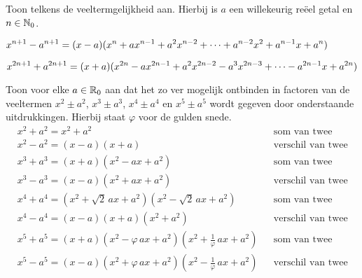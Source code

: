 \documentclass{ximera}
\begin{document}
\begin{Uitbreiding}
\begin{exercise}
Toon telkens de veeltermgelijkheid aan. Hierbij is \(a\) een willekeurig reëel getal en \(n \in \mathbb{N}_0\).

\begin{question}
	\(\displaystyle x^{n+1} - a^{n+1} = (x-a)(x^{n} + ax^{n-1} + a^2x^{n-2} + \dots + a^{n-2}x^2 + a^{n-1}x + a^{n})\)
\end{question}
\begin{question}
	\(\displaystyle x^{2n+1} + a^{2n+1} = (x+a)(x^{2n} - ax^{2n-1} + a^2x^{2n-2} - a^3x^{2n-3} + \dots - a^{2n-1}x + a^{2n})\)
\end{question}
\end{exercise}

\begin{exercise}
\label{somtweevierdemachten}
Toon voor elke \(a \in \mathbb{R}_0\) aan dat het zo ver mogelijk ontbinden in factoren van de veeltermen \(x^2 \pm a^2\), \(x^3 \pm a^3\), \(x^4 \pm a^4\) en  \(x^5 \pm a^5\) wordt gegeven door onderstaande uitdrukkingen. Hierbij staat \(\varphi\) voor de gulden snede. %
\begin{align*}
& x^2 + a^2 = x^2 + a^2 && \text{som van twee kwadraten} \\
& x^2 - a^2 = (x-a)(x+a) && \text{verschil van twee kwadraten} \\
& x^3 + a^3 = (x+a)(x^2 - ax + a^2) && \text{som van twee derde machten} \\
& x^3 - a^3 = (x-a)(x^2 + ax + a^2) && \text{verschil van twee derde machten} \\
& x^4 + a^4 = (x^2 + \sqrt{2}\,ax + a^2)(x^2 - \sqrt{2}\,ax + a^2) && \text{som van twee vierde machten} \\
& x^4 - a^4 = (x-a)(x+a)(x^2+a^2) && \text{verschil van twee vierde machten} \\
& x^5 + a^5 = (x+a)(x^2-\varphi\,ax + a^2)(x^2+\frac{1}{\varphi}\,ax + a^2) && \text{som van twee vijfde machten} \\
& x^5 - a^5 = (x-a)(x^2+\varphi\,ax + a^2)(x^2-\frac{1}{\varphi}\,ax + a^2) && \text{verschil van twee vijfde machten}
\end{align*}
\end{exercise}


\end{Uitbreiding}
\end{document}
